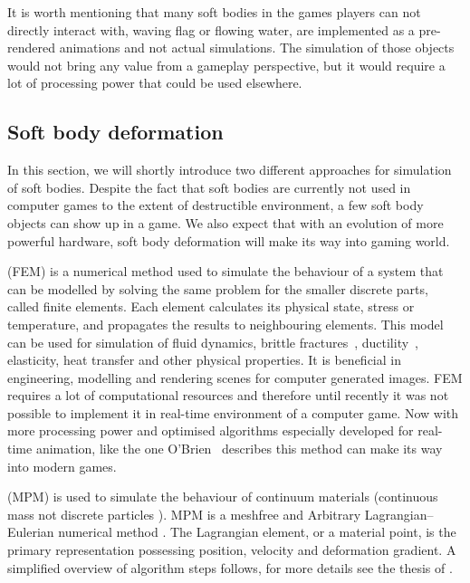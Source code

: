 It is worth mentioning that many soft bodies in the games players can not directly interact with, \eg waving flag or flowing water, are implemented as a pre-rendered animations and not actual simulations. The simulation of those objects would not bring any value from a gameplay perspective, but it would require a lot of processing power that could be used elsewhere. 

\subsection{Soft body deformation}
In this section, we will shortly introduce two different approaches for simulation of soft bodies. Despite the fact that soft bodies are currently not used in computer games to the extent of destructible environment, a few soft body objects can show up in a game. We also expect that with an evolution of more powerful hardware, soft body deformation will make its way into gaming world.
\label{sec:softBody}

 (FEM) is a numerical method used to simulate the behaviour of a system that can be modelled by solving the same problem for the smaller discrete parts, called finite elements. Each element calculates its physical state, \eg stress or temperature, and propagates the results to neighbouring elements. This model can be used for simulation of fluid dynamics, brittle fractures~\cite{brittlefracture}, ductility~\cite{ductilefracture}, elasticity, heat transfer and other physical properties. It is beneficial in engineering, modelling and rendering scenes for computer generated images. FEM requires a lot of computational resources and therefore until recently it was not possible to implement it in real-time environment of a computer game. Now with more processing power and optimised algorithms especially developed for real-time animation, like the one O'Brien~\cite{femingames} describes this method can make its way into modern games.

 (MPM) is used to simulate the behaviour of continuum materials (continuous mass not discrete particles ). MPM is a meshfree and Arbitrary Lagrangian–Eulerian numerical method \cite{ALE}. The Lagrangian element, or a material point, is the primary representation  possessing position, velocity and deformation gradient. A simplified overview of algorithm steps follows, for more details see the thesis of \citet{jiang2015material}.

